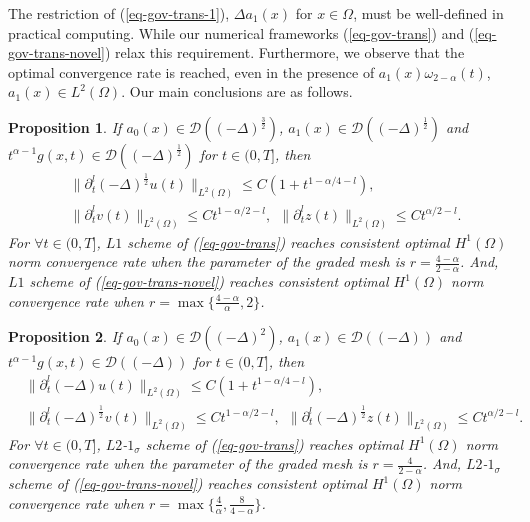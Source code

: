 \documentclass[11pt]{article}
\newtheorem{proposition}{Proposition}
\numberwithin{equation}{section}
\begin{document}
 The restriction of (\ref{eq-gov-trans-1}), $\Delta a_1(x)$ for $x\in\Omega$, must be well-defined in practical computing. While our numerical frameworks (\ref{eq-gov-trans}) and (\ref{eq-gov-trans-novel}) relax this requirement. Furthermore, we observe that the optimal convergence rate is reached, even in the presence of $a_1(x)\omega_{2-\alpha}(t)$, $a_1(x)\in L^2(\Omega)$. Our main conclusions are as follows. 
\begin{proposition}\label{main-pro1}
If $a_0(x)\in \mathcal{D}((-\Delta )^\frac32)$, $a_1(x)\in \mathcal{D}((-\Delta )^\frac12)$ and $t^{\alpha-1}g(x,t)\in \mathcal{D}((-\Delta )^\frac12)$ for $t\in(0,T]$, then
\begin{align}
    &\|\partial_t^l(-\Delta)^{\frac12} u(t)\|_{L^2(\Omega)}\leq C(1+t^{1-\alpha/4-l}),\\
    &\|\partial_t^l v(t)\|_{L^2(\Omega)}\leq Ct^{1-\alpha/2-l},~~\|\partial_t^l z(t)\|_{L^2(\Omega)}\leq Ct^{\alpha/2-l}.
\end{align}
For $\forall t\in(0,T]$, $L1$ scheme of (\ref{eq-gov-trans}) reaches consistent optimal $H^1(\Omega)$ norm convergence rate when the parameter of the graded mesh is $r=\frac{4-\alpha}{2-\alpha}$. And, $L1$ scheme of (\ref{eq-gov-trans-novel}) reaches consistent optimal $H^1(\Omega)$ norm convergence rate when $r=\max\{\frac{4-\alpha}{\alpha},2\}$.
\end{proposition}

\begin{proposition}\label{main-pro2}
If $a_0(x)\in \mathcal{D}((-\Delta )^2)$, $a_1(x)\in \mathcal{D}((-\Delta ))$ and $t^{\alpha-1}g(x,t)\in \mathcal{D}((-\Delta ))$ for $t\in(0,T]$, then
\begin{align}
    &\|\partial_t^l(-\Delta)u(t)\|_{L^2(\Omega)}\leq C(1+t^{1-\alpha/4-l}), \\
    &\|\partial_t^l(-\Delta)^{\frac12} v(t)\|_{L^2(\Omega)}\leq Ct^{1-\alpha/2-l},
    ~~\|\partial_t^l(-\Delta)^{\frac12} z(t)\|_{L^2(\Omega)}\leq Ct^{\alpha/2-l}.
\end{align}
For $\forall t\in(0,T]$, $L2$-$1_\sigma$ scheme of (\ref{eq-gov-trans}) reaches optimal $H^1(\Omega)$ norm convergence rate when the parameter of the graded mesh is $r=\frac{4}{2-\alpha}$. And, $L2$-$1_\sigma$ scheme of (\ref{eq-gov-trans-novel}) reaches consistent optimal $H^1(\Omega)$ norm convergence rate when $r=\max\{\frac{4}{\alpha},\frac{8}{4-\alpha}\}$.
\end{proposition}
\end{document}
